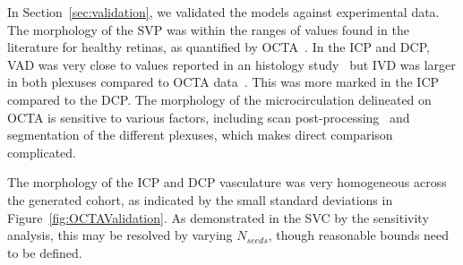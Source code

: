 \documentclass[11pt,]{article}
\begin{document}
In Section~\ref{sec:validation}, we validated the models against experimental data.
The morphology of the SVP was within the ranges of values found in the literature for healthy retinas, as quantified by OCTA~\cite{Mehta_2019,Chu2016,Liu_2021,Ma2021,Agarwal_2019}.
In the ICP and DCP, VAD was very close to values reported in an histology study~\cite{Chan2012} but IVD was larger in both plexuses compared to OCTA data~\cite{Liu_2021}.
This was more marked in the ICP compared to the DCP.
The morphology of the microcirculation delineated on OCTA is sensitive to various factors, including scan post-processing~\cite{Mehta_2020,Mehta_2019} and segmentation of the different plexuses, which makes direct comparison complicated.

The morphology of the ICP and DCP vasculature was very homogeneous across the generated cohort, as indicated by the small standard deviations in Figure~\ref{fig:OCTAValidation}.
As demonstrated in the SVC by the sensitivity analysis, this may be resolved by varying $N_{seeds}$, though reasonable bounds need to be defined.
\end{document}
